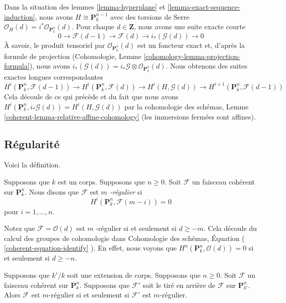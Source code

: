 \begin{remark}
\label{remark-exact-sequence-induction-cohomology}
Dans la situation des lemmes \ref{lemma-hyperplane} et
\ref{lemma-exact-sequence-induction}, nous avons $H \cong
\mathbf{P}^{n - 1}_k$ avec des torsions de Serre
$\mathcal{O}_H(d) = i^*\mathcal{O}_{\mathbf{P}^n_k}(d)$. Pour
chaque $d \in \mathbf{Z}$, nous avons une suite exacte courte
$$
0 \to \mathcal{F}(d - 1) \to \mathcal{F}(d) \to i_*(\mathcal{G}(d)) \to 0
$$
À savoir, le produit tensoriel par
$\mathcal{O}_{\mathbf{P}^n_k}(d)$ est un foncteur exact et,
d'après la formule de projection (Cohomologie, Lemme
\ref{cohomology-lemma-projection-formula}), nous avons
$i_*(\mathcal{G}(d)) = i_*\mathcal{G} \otimes
\mathcal{O}_{\mathbf{P}^n_k}(d)$. Nous obtenons des suites exactes longues correspondantes
$$
H^i(\mathbf{P}^n_k, \mathcal{F}(d - 1)) \to
H^i(\mathbf{P}^n_k, \mathcal{F}(d)) \to
H^i(H, \mathcal{G}(d)) \to
H^{i + 1}(\mathbf{P}^n_k, \mathcal{F}(d - 1))
$$
Cela découle de ce qui précède et du fait que nous avons
$H^i(\mathbf{P}^n_k, i_*\mathcal{G}(d)) = H^i(H,
\mathcal{G}(d))$ par la cohomologie des schémas, Lemme
\ref{coherent-lemma-relative-affine-cohomology} (les immersions fermées sont affines).
\end{remark}





\subsection{Régularité}
\label{subsection-regularity}

\noindent
Voici la définition.

\begin{definition}
\label{definition-regularity}
Supposons que $k$ est un corps. Supposons que $n \geq 0$.
Soit $\mathcal{F}$ un faisceau cohérent sur
$\mathbf{P}^n_k$. Nous disons que $\mathcal{F}$ est {\it $m$ -régulier } si
$$
H^i(\mathbf{P}^n_k, \mathcal{F}(m - i)) = 0
$$
pour $i = 1, \ldots, n$.
\end{definition}

\noindent
Notez que $\mathcal{F} = \mathcal{O}(d)$ est $m$ -régulier si
et seulement si $d \geq -m$. Cela découle du calcul des groupes
de cohomologie dans Cohomologie des schémas, Équation (
\ref{coherent-equation-identify} ). En effet, nous voyons que
$H^n(\mathbf{P}^n_k, \mathcal{O}(d)) = 0$ si et seulement si $d \geq -n$.

\begin{lemma}
\label{lemma-m-regular-extend-base-field}
Supposons que $k'/k$ soit une extension de corps. Supposons que
$n \geq 0$. Soit $\mathcal{F}$ un faisceau cohérent sur
$\mathbf{P}^n_k$. Supposons que $\mathcal{F}'$ soit le tiré en
arrière de $\mathcal{F}$ sur $\mathbf{P}^n_{k'}$. Alors $\mathcal{F}$
est $m$-régulier si et seulement si $\mathcal{F}'$ est $m$-régulier.
\end{lemma}

